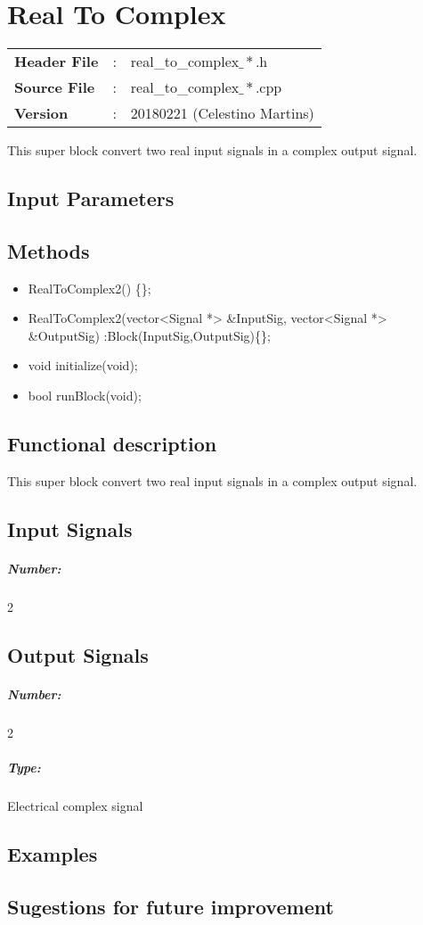 \clearpage

\section{Real To Complex}

\begin{tcolorbox}	
	\begin{tabular}{p{2.75cm} p{0.2cm} p{10.5cm}} 	
		\textbf{Header File}   &:& real\_to\_complex$\_*$.h \\
		\textbf{Source File}   &:& real\_to\_complex$\_*$.cpp \\
        \textbf{Version}       &:& 20180221 (Celestino Martins) \\
	\end{tabular}
\end{tcolorbox}

This super block convert two real input signals in a complex output signal.

\subsection*{Input Parameters}



\subsection*{Methods}

\begin{itemize}
  \item RealToComplex2() \{\};
  \item RealToComplex2(vector<Signal *> \&InputSig, vector<Signal *> \&OutputSig) :Block(InputSig,OutputSig)\{\};
  \item void initialize(void);
  \item bool runBlock(void);
\end{itemize}

\subsection*{Functional description}

This super block convert two real input signals in a complex output signal.


\pagebreak
\subsection*{Input Signals}

\subparagraph*{Number:} 2

\subsection*{Output Signals}

\subparagraph*{Number:} 2

\subparagraph*{Type:} Electrical complex signal

\subsection*{Examples}

\subsection*{Sugestions for future improvement}


